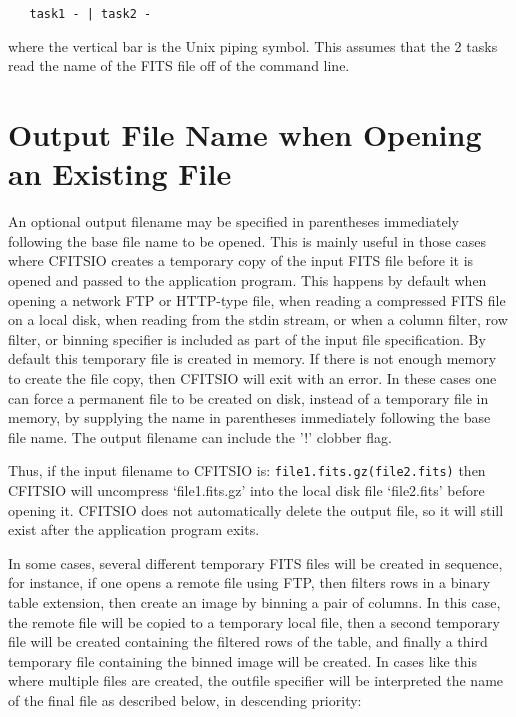 \documentclass[11pt]{book}
\begin{document}
\begin{verbatim}
   task1 - | task2 -
\end{verbatim}
where the vertical bar is the Unix piping symbol.  This assumes that the 2
tasks read the name of the FITS file off of the command line.


\section{Output File Name when Opening an Existing File}

An optional output filename may be specified in parentheses immediately
following the base file name to be opened.  This is mainly useful in
those cases where CFITSIO creates a temporary copy of the input FITS
file before it is opened and passed to the application program.  This
happens by default when opening a network FTP or HTTP-type file, when
reading a compressed FITS file on a local disk, when reading from the
stdin stream, or when a column filter, row filter, or binning specifier
is included as part of the input file specification.  By default this
temporary file is created in memory.  If there is not enough memory to
create the file copy, then CFITSIO will exit with an error.   In these
cases one can force a permanent file to be created on disk, instead of
a temporary file in memory, by supplying the name in parentheses
immediately following the base file name.  The output filename can
include the '!' clobber flag.

Thus, if the input filename to CFITSIO is:
\verb+file1.fits.gz(file2.fits)+
then CFITSIO will uncompress `file1.fits.gz' into the local disk file
`file2.fits' before opening it.  CFITSIO does not automatically delete
the output file, so it will still exist after the application program
exits.

In some cases, several different temporary FITS files will be created
in sequence, for instance, if one opens a remote file using FTP, then
filters rows in a binary table extension, then create an image by
binning a pair of columns.  In this case, the remote file will be
copied to a temporary local file, then a second temporary file will be
created containing the filtered rows of the table, and finally a third
temporary file containing the binned image will be created.  In cases
like this where multiple files are created, the outfile specifier will
be interpreted the name of the final file as described below, in descending
priority:
\end{document}
